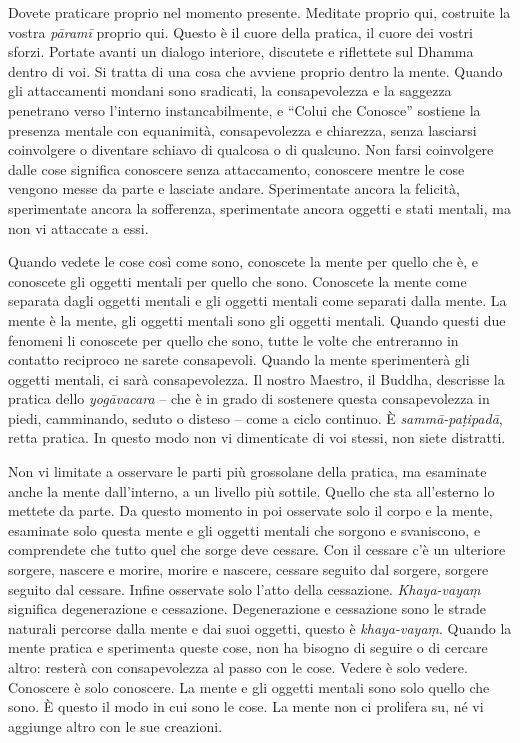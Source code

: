 Dovete praticare proprio nel momento presente. Meditate proprio qui,
costruite la vostra \emph{pāramī} proprio qui. Questo è il cuore della
pratica, il cuore dei vostri sforzi. Portate avanti un dialogo
interiore, discutete e riflettete sul Dhamma dentro di voi. Si tratta di
una cosa che avviene proprio dentro la mente. Quando gli attaccamenti
mondani sono sradicati, la consapevolezza e la saggezza penetrano verso
l'interno instancabilmente, e ``Colui che Conosce'' sostiene la presenza
mentale con equanimità, consapevolezza e chiarezza, senza lasciarsi
coinvolgere o diventare schiavo di qualcosa o di qualcuno. Non farsi
coinvolgere dalle cose significa conoscere senza attaccamento, conoscere
mentre le cose vengono messe da parte e lasciate andare. Sperimentate
ancora la felicità, sperimentate ancora la sofferenza, sperimentate
ancora oggetti e stati mentali, ma non vi attaccate a essi.

Quando vedete le cose così come sono, conoscete la mente per quello che
è, e conoscete gli oggetti mentali per quello che sono. Conoscete la
mente come separata dagli oggetti mentali e gli oggetti mentali come
separati dalla mente. La mente è la mente, gli oggetti mentali sono gli
oggetti mentali. Quando questi due fenomeni li conoscete per quello che
sono, tutte le volte che entreranno in contatto reciproco ne sarete
consapevoli. Quando la mente sperimenterà gli oggetti mentali, ci sarà
consapevolezza. Il nostro Maestro, il Buddha, descrisse la pratica dello
\emph{yogāvacara} -- che è in grado di sostenere questa consapevolezza
in piedi, camminando, seduto o disteso -- come a ciclo continuo. È
\emph{sammā-paṭipadā}, retta pratica. In questo modo non vi dimenticate
di voi stessi, non siete distratti.

Non vi limitate a osservare le parti più grossolane della pratica, ma
esaminate anche la mente dall'interno, a un livello più sottile. Quello
che sta all'esterno lo mettete da parte. Da questo momento in poi
osservate solo il corpo e la mente, esaminate solo questa mente e gli
oggetti mentali che sorgono e svaniscono, e comprendete che tutto quel
che sorge deve cessare. Con il cessare c'è un ulteriore sorgere, nascere
e morire, morire e nascere, cessare seguito dal sorgere, sorgere seguito
dal cessare. Infine osservate solo l'atto della cessazione.
\emph{Khaya-vayaṃ} significa degenerazione e cessazione. Degenerazione e
cessazione sono le strade naturali percorse dalla mente e dai suoi
oggetti, questo è \emph{khaya-vayaṃ}. Quando la mente pratica e
sperimenta queste cose, non ha bisogno di seguire o di cercare altro:
resterà con consapevolezza al passo con le cose. Vedere è solo vedere.
Conoscere è solo conoscere. La mente e gli oggetti mentali sono solo
quello che sono. È questo il modo in cui sono le cose. La mente non ci
prolifera su, né vi aggiunge altro con le sue creazioni.

